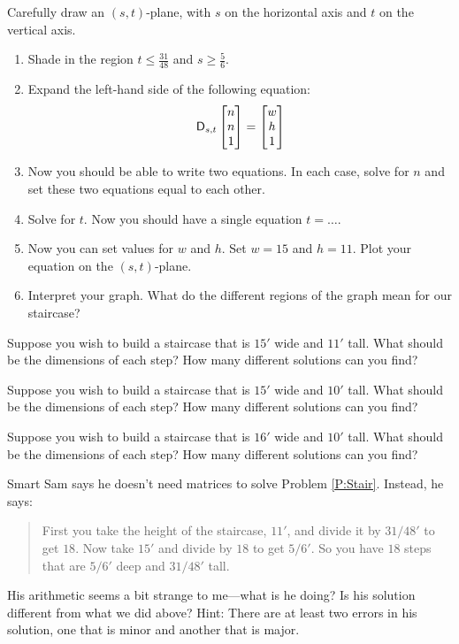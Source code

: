 \documentclass[handout,noauthor,nooutcomes]{ximera}
\begin{document}
\begin{problem}
Carefully draw an $(s,t)$-plane, with $s$ on the horizontal axis and $t$ on the vertical axis. 
\begin{enumerate}
\item Shade in the region  $t\le \frac{31}{48}$ and $s\ge \frac{5}{6}$.
\item Expand the left-hand side of the following equation: 
\[
\mathsf{D}_{s,t}
\begin{bmatrix}
n \\ n \\ 1
\end{bmatrix}
= 
\begin{bmatrix}
w \\
h \\
1
\end{bmatrix}
\]
\item Now you should be able to write two equations. In each case, solve for $n$ and set these two equations equal to each other. 
\item Solve for $t$. Now you should have a single equation $t= \dots$.
\item Now you can set values for $w$ and $h$. Set $w = 15$ and $h=11$. Plot your equation on the $(s,t)$-plane.
\item Interpret your graph.  What do the different regions of the graph mean for our staircase?
\end{enumerate}
\end{problem}


\begin{problem}\label{P:Stair}
Suppose you wish to build a staircase that is $15'$ wide and $11'$
tall. What should be the dimensions of each step? How many different
solutions can you find?
\end{problem}

\begin{problem}
Suppose you wish to build a staircase that is $15'$ wide and $10'$
tall. What should be the dimensions of each step? How many different
solutions can you find?
\end{problem}

\begin{problem}
Suppose you wish to build a staircase that is $16'$ wide and $10'$
tall. What should be the dimensions of each step? How many different
solutions can you find?
\end{problem}


\begin{problem}
Smart Sam says he doesn't need matrices to solve
Problem \ref{P:Stair}. Instead, he says:
\begin{quote}
First you take the height of the staircase, $11'$, and divide it by
$31/48'$ to get $18$. Now take $15'$ and divide by $18$ to get
$5/6'$. So you have $18$ steps that are $5/6'$ deep and $31/48'$ tall.
\end{quote}
His arithmetic seems a bit strange to me---what is he doing?  Is his
solution different from what we did above? Hint: There are at least
two errors in his solution, one that is minor and another that is
major.
\end{problem}
\end{document}
